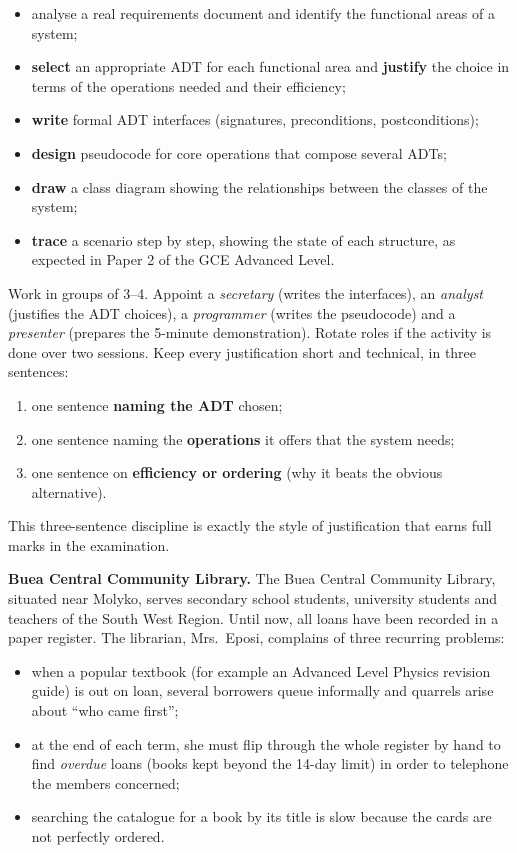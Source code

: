 \documentclass[11pt]{article}
\newcounter{popsec}
\newcounter{popsub}
\newcommand{\courssub}[1]{%
  \stepcounter{popsub}%
  \par\vspace{9pt}\noindent{\popxbold\fontsize{11.5}{13}\selectfont\color{popink}{\color{poporange}\thepopsec.\thepopsub}\hspace{6pt}#1}\par\nopagebreak\vspace{4pt}
}
\begin{document}
\begin{itemize}
\item analyse a real requirements document and identify the functional areas of a system;
\item \textbf{select} an appropriate ADT for each functional area and \textbf{justify} the choice in terms of the operations needed and their efficiency;
\item \textbf{write} formal ADT interfaces (signatures, preconditions, postconditions);
\item \textbf{design} pseudocode for core operations that compose several ADTs;
\item \textbf{draw} a class diagram showing the relationships between the classes of the system;
\item \textbf{trace} a scenario step by step, showing the state of each structure, as expected in Paper 2 of the GCE Advanced Level.
\end{itemize}

\begin{methode}
Work in groups of 3--4. Appoint a \emph{secretary} (writes the interfaces), an \emph{analyst} (justifies the ADT choices), a \emph{programmer} (writes the pseudocode) and a \emph{presenter} (prepares the 5-minute demonstration). Rotate roles if the activity is done over two sessions. Keep every justification short and technical, in three sentences:
\begin{enumerate}
\item one sentence \textbf{naming the ADT} chosen;
\item one sentence naming the \textbf{operations} it offers that the system needs;
\item one sentence on \textbf{efficiency or ordering} (why it beats the obvious alternative).
\end{enumerate}
This three-sentence discipline is exactly the style of justification that earns full marks in the examination.
\end{methode}

\courssub{Situation}

\textbf{Buea Central Community Library.} The Buea Central Community Library, situated near Molyko, serves secondary school students, university students and teachers of the South West Region. Until now, all loans have been recorded in a paper register. The librarian, Mrs.\ Eposi, complains of three recurring problems:

\begin{itemize}
\item when a popular textbook (for example an Advanced Level Physics revision guide) is out on loan, several borrowers queue informally and quarrels arise about ``who came first'';
\item at the end of each term, she must flip through the whole register by hand to find \emph{overdue} loans (books kept beyond the 14-day limit) in order to telephone the members concerned;
\item searching the catalogue for a book by its title is slow because the cards are not perfectly ordered.
\end{itemize}
\end{document}
